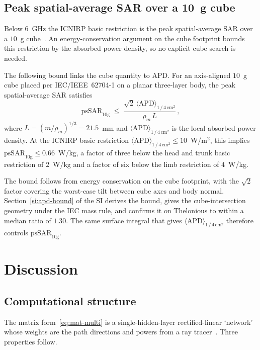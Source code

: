 \documentclass[journal,twocolumn,10pt]{IEEEtran}
\newcommand{\APDAvg}{\langle\mathrm{APD}\rangle_{1\,/\,4\,\mathrm{cm}^2}}
\providecommand{\DIFdelbegin}{} %
\providecommand{\DIFdelend}{} %
\newcommand{\DIFscaledelfig}{0.5}
\newlength{\DIFdelgraphicswidth} %
\newlength{\DIFdelgraphicsheight} %
\newcommand{\DIFdelincludegraphics}[2][]{%
\sbox{\DIFdelgraphicsbox}{\DIFOincludegraphics[#1]{#2}}%
\settoboxwidth{\DIFdelgraphicswidth}{\DIFdelgraphicsbox} %
\settoboxtotalheight{\DIFdelgraphicsheight}{\DIFdelgraphicsbox} %
\scalebox{\DIFscaledelfig}{%
\parbox[b]{\DIFdelgraphicswidth}{\usebox{\DIFdelgraphicsbox}\\[-\baselineskip] \rule{\DIFdelgraphicswidth}{0em}}\llap{\resizebox{\DIFdelgraphicswidth}{\DIFdelgraphicsheight}{%
\setlength{\unitlength}{\DIFdelgraphicswidth}%
\begin{picture}(1,1)%
\thicklines\linethickness{2pt} %
{\color[rgb]{1,0,0}\put(0,0){\framebox(1,1){}}}%
{\color[rgb]{1,0,0}\put(0,0){\line( 1,1){1}}}%
{\color[rgb]{1,0,0}\put(0,1){\line(1,-1){1}}}%
\end{picture}%
}\hspace*{3pt}}} %
} %
\DeclareRobustCommand{\DIFdelbegin}{\DIFOdelbegin \let\includegraphics\DIFdelincludegraphics} %
\DeclareRobustCommand{\DIFdelend}{\DIFOaddend \let\includegraphics\DIFOincludegraphics} %
\begin{document}
\subsection{Peak spatial-average SAR over a 10~g cube}\label{subsec:compl-cube}

Below $6$~GHz the ICNIRP basic restriction is the peak spatial-average
SAR over a $10$~g cube~\cite{ICNIRP2020,62704-1}. An
energy-conservation argument on the cube footprint bounds this
restriction by the absorbed power density, so no explicit cube search
is needed.

The following bound links the cube quantity to APD. \DIFdelbegin %
\DIFdelend For an axis-aligned
$10$~g cube placed per IEC/IEEE~62704-1 on a planar
three-layer body, the peak spatial-average SAR satisfies
\begin{equation}\label{eq:apd-bound}
  \mathrm{psSAR}_{10\mathrm{g}}
  \;\le\; \frac{\sqrt{2}\,\APDAvg}{\rho_m\,L}\, ,
\end{equation}
where $L = (m/\rho_m)^{1/3} = 21.5$~mm and $\APDAvg$ is the local
absorbed power density. At the ICNIRP basic restriction
$\APDAvg \le 10$~W/m$^2$, this implies
$\mathrm{psSAR}_{10\mathrm{g}} \le 0.66$~W/kg, a factor of three below
the head and trunk basic restriction of $2$~W/kg and a factor of six
below the limb restriction of $4$~W/kg.
\DIFdelbegin %
\DIFdelend

The bound follows from energy conservation on the cube footprint,
with the $\sqrt{2}$ factor covering the worst-case tilt between cube
axes and body normal. Section~\ref{si:apd-bound} of the SI derives the bound,
gives the cube-intersection geometry under the IEC mass rule, and
confirms it on Thelonious to within a median ratio of $1.30$. The same
surface integral that gives $\APDAvg$ therefore controls
$\mathrm{psSAR}_{10\mathrm{g}}$.

\section{Discussion}\label{sec:disc}

\subsection{Computational structure}\label{subsec:disc-primitives}

The matrix form~\eqref{eq:mat-multi} is a single-hidden-layer
rectified-linear `network' whose weights are the path directions and
powers from a ray tracer~\cite{SionnaRT}. Three properties follow.
\end{document}
